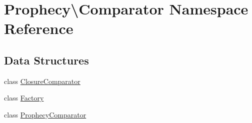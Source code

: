 \hypertarget{namespace_prophecy_1_1_comparator}{}\section{Prophecy\textbackslash{}Comparator Namespace Reference}
\label{namespace_prophecy_1_1_comparator}
\subsection*{Data Structures}
\begin{DoxyCompactItemize}
\item 
class \mbox{\hyperlink{class_prophecy_1_1_comparator_1_1_closure_comparator}{Closure\+Comparator}}
\item 
class \mbox{\hyperlink{class_prophecy_1_1_comparator_1_1_factory}{Factory}}
\item 
class \mbox{\hyperlink{class_prophecy_1_1_comparator_1_1_prophecy_comparator}{Prophecy\+Comparator}}
\end{DoxyCompactItemize}
